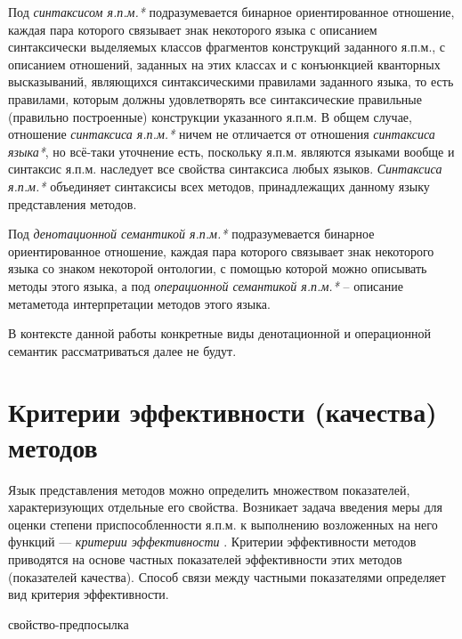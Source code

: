 Под \textit{синтаксисом я.п.м.*} подразумевается бинарное ориентированное отношение, каждая пара которого связывает знак некоторого языка с описанием синтаксически выделяемых классов фрагментов конструкций заданного я.п.м., с описанием отношений, заданных на этих классах и с конъюнкцией кванторных высказываний, являющихся синтаксическими правилами заданного языка, то есть правилами, которым должны удовлетворять все синтаксические правильные (правильно построенные) конструкции указанного я.п.м. В общем случае, отношение \textit{синтаксиса я.п.м.*} ничем не отличается от отношения \textit{синтаксиса языка*}, но всё-таки уточнение есть, поскольку я.п.м. являются языками вообще и синтаксис я.п.м. наследует все свойства синтаксиса любых языков. \textit{Синтаксиса я.п.м.*} объединяет синтаксисы всех методов, принадлежащих данному языку представления методов.

Под \textit{денотационной семантикой я.п.м.*} подразумевается бинарное ориентированное отношение, каждая пара которого связывает знак некоторого языка со знаком некоторой онтологии, с помощью которой можно описывать методы этого языка, а под \textit{операционной семантикой я.п.м.*} -- описание метаметода интерпретации методов этого языка.

В контексте данной работы конкретные виды денотационной и операционной семантик рассматриваться далее не будут.

\section{Критерии эффективности (качества) методов}
\label{sec_programs_method_kriteria}

Язык представления методов можно определить множеством показателей, характеризующих отдельные его свойства. Возникает задача введения меры для оценки степени приспособленности я.п.м. к выполнению возложенных на него функций — \textit{критерии эффективности} \cite{Orlov2013}. Критерии эффективности методов приводятся на основе частных показателей эффективности этих методов (показателей качества). Способ связи между частными показателями определяет вид критерия эффективности.

\begin{SCn}
\begin{scnrelfromlist}{свойство-предпосылка}
\end{scnrelfromlist}
\end{SCn}

